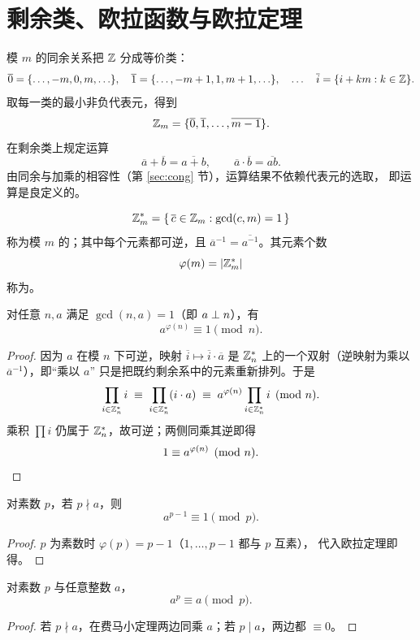 \section{剩余类、欧拉函数与欧拉定理}\label{sec:euler}

模 $m$ 的同余关系把 $\mathbb{Z}$ 分成等价类：
\[
  \overline{0}=\{\ldots,-m,0,m,\ldots\},\quad
  \overline{1}=\{\ldots,-m+1,1,m+1,\ldots\},\quad\ldots\quad
  \overline{i}=\{i+km : k\in\mathbb{Z}\}.
\]
取每一类的最小非负代表元，得到
\[
  \mathbb{Z}_m=\{\overline{0},\overline{1},\ldots,\overline{m-1}\}.
\]
在剩余类上规定运算
\[
  \overline{a}+\overline{b}=\overline{a+b},\qquad
  \overline{a}\cdot\overline{b}=\overline{ab}.
\]
由同余与加乘的相容性（第 \ref{sec:cong} 节），运算结果不依赖代表元的选取，
即运算是良定义的。

\begin{definition}[既约剩余系与欧拉函数]
\[
  \mathbb{Z}_m^{*}=\{\,\overline{c}\in\mathbb{Z}_m : \gcd(c,m)=1\,\}
\]
称为模 $m$ 的；其中每个元素都可逆，且
$\overline{a}^{-1}=\overline{a^{-1}}$。其元素个数
\[
  \varphi(m)=|\mathbb{Z}_m^{*}|
\]
称为。
\end{definition}

\begin{theorem}[欧拉定理]\label{thm:euler}
对任意 $n,a$ 满足 $\gcd(n,a)=1$（即 $a\perp n$），有
\[
  a^{\varphi(n)}\equiv1\pmod n.
\]
\end{theorem}

\begin{proof}
因为 $a$ 在模 $n$ 下可逆，映射 $\overline{i}\mapsto\overline{i}\cdot\overline{a}$
是 $\mathbb{Z}_n^{*}$ 上的一个双射（逆映射为乘以 $\overline{a}^{-1}$），即“乘以 $a$”
只是把既约剩余系中的元素重新排列。于是
\[
  \prod_{i\in\mathbb{Z}_n^{*}} i \;\equiv\; \prod_{i\in\mathbb{Z}_n^{*}}(i\cdot a)
  \;\equiv\; a^{\varphi(n)}\prod_{i\in\mathbb{Z}_n^{*}} i \pmod n.
\]
乘积 $\prod i$ 仍属于 $\mathbb{Z}_n^{*}$，故可逆；两侧同乘其逆即得
\[
  1\equiv a^{\varphi(n)}\pmod n. \qedhere
\]
\end{proof}

\begin{corollary}[费马小定理]\label{cor:fermat}
对素数 $p$，若 $p\nmid a$，则
\[
  a^{p-1}\equiv1\pmod p.
\]
\end{corollary}

\begin{proof}
$p$ 为素数时 $\varphi(p)=p-1$（$1,\ldots,p-1$ 都与 $p$ 互素），
代入欧拉定理即得。
\end{proof}

\begin{corollary}\label{cor:fermat-all}
对素数 $p$ 与任意整数 $a$，
\[
  a^{p}\equiv a\pmod p.
\]
\end{corollary}

\begin{proof}
若 $p\nmid a$，在费马小定理两边同乘 $a$；若 $p\mid a$，两边都 $\equiv0$。
\end{proof}
